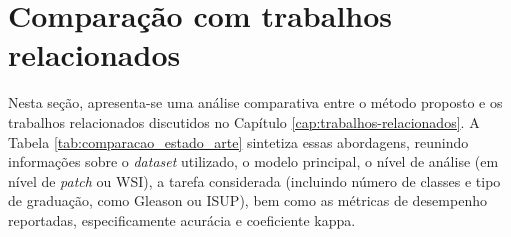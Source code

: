 \section{Comparação com trabalhos relacionados}

Nesta seção, apresenta-se uma análise comparativa entre o método proposto e os trabalhos relacionados discutidos no Capítulo \ref{cap:trabalhos-relacionados}. A Tabela \ref{tab:comparacao_estado_arte} sintetiza essas abordagens, reunindo informações sobre o \textit{dataset} utilizado, o modelo principal, o nível de análise (em nível de \textit{patch} ou WSI), a tarefa considerada (incluindo número de classes e tipo de graduação, como Gleason ou ISUP), bem como as métricas de desempenho reportadas, especificamente acurácia e coeficiente kappa.

\begin{table}[htb]
	\centering
	\scriptsize
	\setlength{\tabcolsep}{3pt}
	\renewcommand{\arraystretch}{1.0}
	
\end{table}
